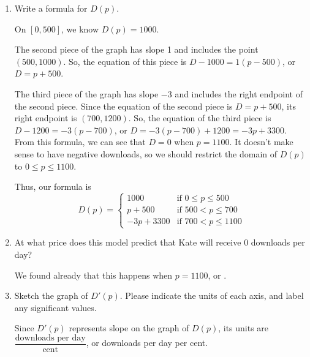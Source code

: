 \documentclass{article}
\theoremstyle{theorem}
\begin{document}
\begin{enumerate}
\begin{enumerate}
  \item
    \begin{problem}[\vfill\newpage]
      Write a formula for $D(p)$. 
    \end{problem}

    \begin{solution}
      On $[0, 500]$, we know $D(p) = 1000$.

      The second piece of the graph has slope 1 and includes the point $(500, 1000)$. So, the equation of this piece is $D - 1000 = 1 (p - 500)$, or $D = p + 500$.

      The third piece of the graph has slope $-3$ and includes the right endpoint of the second piece. Since the equation of the second piece is $D = p + 500$, its right endpoint is $(700, 1200)$. So, the equation of the third piece is $D - 1200 = -3(p - 700)$, or $D = -3(p - 700) + 1200 = -3p + 3300$. From this formula, we can see that $D = 0$ when $p = 1100$. It doesn't make sense to have negative downloads, so we should restrict the domain of $D(p)$ to $0 \leq p \leq 1100$.

      Thus, our formula is
      \[ 
        \boxed{D(p)=
          \begin{cases}
            1000 &\text{if } 0\leq p \leq 500 \\
            p+500 &\text{if } 500<p\leq 700 \\
            -3p+3300 &\text{if } 700<p\leq 1100
          \end{cases}}\]
    \end{solution}

  \item
    \begin{problem}[\stretch{0.5}]
      At what price does this model predict that Kate will receive 0 downloads per day?
    \end{problem}

    \begin{solution}
      We found already that this happens when $p = 1100$, or .
    \end{solution}

  \item
    \begin{problem}[\vfill\newpage]
      Sketch the graph of $D'(p)$. Please indicate the units of each axis, and label any significant values. 
    \end{problem}

    \begin{solution}
      Since $D'(p)$ represents slope on the graph of $D(p)$, its units are $\dfrac{\text{downloads per day}}{\text{cent}}$, or downloads per day per cent.


\end{solution}
\end{enumerate}
\end{enumerate}
\end{document}
